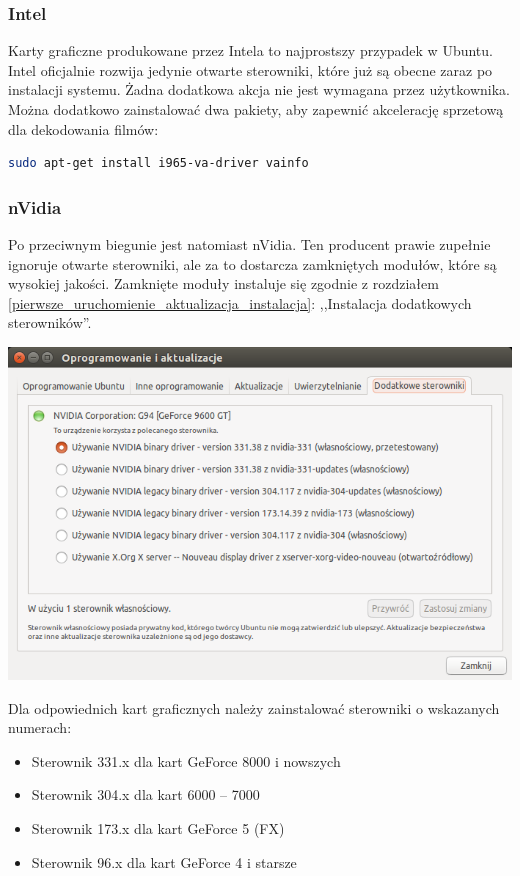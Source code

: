 \subsubsection{Intel}
Karty graficzne produkowane przez Intela to najprostszy przypadek w Ubuntu. Intel oficjalnie rozwija jedynie otwarte sterowniki, które już są obecne zaraz po instalacji systemu. Żadna dodatkowa akcja nie jest wymagana przez użytkownika. Można dodatkowo zainstalować dwa pakiety, aby zapewnić akcelerację sprzetową dla dekodowania filmów:

\begin{lstlisting}[language=bash]
sudo apt-get install i965-va-driver vainfo
\end{lstlisting}

\subsubsection{nVidia}
Po przeciwnym biegunie jest natomiast nVidia. Ten producent prawie zupełnie ignoruje otwarte sterowniki, ale za to dostarcza zamkniętych modułów, które są wysokiej jakości. Zamknięte moduły instaluje się zgodnie z rozdziałem \ref{pierwsze_uruchomienie_aktualizacja_instalacja}: ,,Instalacja dodatkowych sterowników''. 

\begin{center}
	\includegraphics[width=\linewidth]{images/pierwsze_uruchomienie_driver2.png}
\end{center}

Dla odpowiednich kart graficznych należy zainstalować sterowniki o wskazanych numerach:
\begin{itemize}
\item Sterownik 331.x dla kart GeForce 8000 i nowszych
\item Sterownik 304.x dla kart 6000 -- 7000
\item Sterownik 173.x dla kart GeForce 5 (FX)
\item Sterownik 96.x dla kart GeForce 4 i starsze
\end{itemize}

